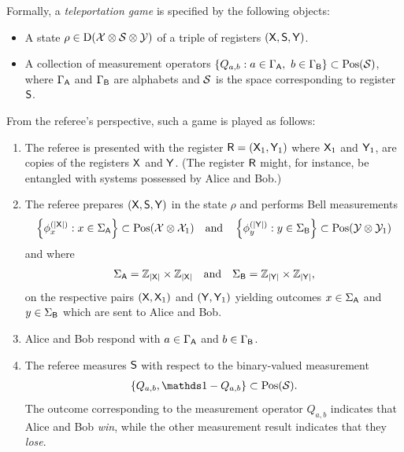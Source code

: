 Formally, a \emph{teleportation game} is specified by the following objects:
\begin{itemize}
	\item A state $\rho \in \Density(\X \otimes \S \otimes \Y)$ of a triple of registers $(\reg{X},\reg{S},\reg{Y})$. 
	\item A collection of measurement operators $\{ Q_{a,b} : a \in \GammaA, \ b \in \GammaB \} \subset \Pos(\S)$, where $\GammaA$ and $\GammaB$ are alphabets and $\S$ is the space corresponding to register $\reg{S}$. 
\end{itemize}
From the referee's perspective, such a game is played as follows:
\begin{enumerate}
	\item The referee is presented with the register $\reg{R} = (\reg{X}_1,\reg{Y}_1)$ where $\reg{X}_1$ and $\reg{Y}_1$, are copies of the registers $\reg{X}$ and $\reg{Y}$. (The register $\reg{R}$ might, for instance, be entangled with systems possessed by Alice and Bob.)
	\item The referee prepares $(\reg{X},\reg{S},\reg{Y})$ in the state $\rho$ and performs Bell measurements
		\begin{align} \label{eq:bell-basis-telep-game}
			\left \{ \phi_{x}^{(\abs{\reg{X}})} : x \in \SigmaA \right \} \subset \Pos(\X \otimes \X_1) \quad \textnormal{and} \quad \left \{ \phi_{y}^{(\abs{\reg{Y}})} : y \in \SigmaB \right \} \subset \Pos(\Y \otimes \Y_1)
		\end{align}		
	 and where 
	\begin{align}
	 	\SigmaA = \integer_{\abs{\reg{X}}} \times \integer_{\abs{\reg{X}}} \quad \textnormal{and} \quad \SigmaB = \integer_{\abs{\reg{Y}}} \times \integer_{\abs{\reg{Y}}},
	 \end{align}
	 on the respective pairs $(\reg{X},\reg{X}_1)$ and $(\reg{Y},\reg{Y}_1)$ yielding outcomes $x \in \SigmaA$ and $y \in \SigmaB$ which are sent to Alice and Bob.
	\item Alice and Bob respond with $a \in \GammaA$ and $b \in \GammaB$. 
	\item The referee measures $\reg{S}$ with respect to the binary-valued measurement 
		\begin{align}
			\{Q_{a,b}, \I - Q_{a,b}\} \subset \Pos(\S).		
		\end{align} 
	The outcome corresponding to the measurement operator $Q_{a,b}$ indicates that Alice and Bob \emph{win}, while the other measurement result indicates that they \emph{lose}.  
\end{enumerate}

